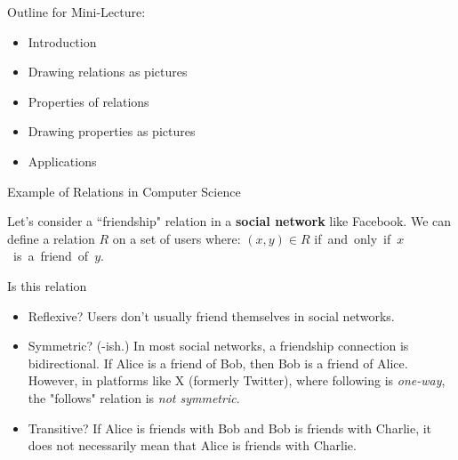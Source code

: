 \documentclass[10pt]{beamer}
\begin{document}
\begin{frame}[standout]
Outline for Mini-Lecture:
\begin{itemize}
\item \textbullet \quad Introduction
\item \textbullet \quad Drawing relations as pictures
\item \textbullet \quad Properties of relations
\item \textbullet \quad Drawing properties as pictures
\item \alert{\textbullet \quad Applications}
\end{itemize}
\end{frame}




\begin{frame}{Example of Relations in Computer Science}
\footnotesize 
\begin{mygreenbox}[title=Example]

Let's consider a ``friendship" relation in a \textbf{social network} like Facebook. We can define a relation $R$ on a set of users where: $(x,y) \in R$ if and only if $x$ is a friend of $y$. 
\end{mygreenbox}

\begin{myyellowbox}[title=Poll]
Is this relation
\begin{itemize}
\item Reflexive? \pause \redx Users don't usually friend themselves in social networks. 
\item Symmetric? \pause \greencheck(-ish.) In most social networks, a friendship connection is bidirectional. If Alice is a friend of Bob, then Bob is a friend of Alice.  However, in platforms like X (formerly Twitter), where following is \textit{one-way}, the "follows" relation is \textit{not symmetric}.
\item Transitive? \pause \redx If  Alice is friends with Bob and Bob is friends with Charlie, it does not necessarily mean that Alice is friends with Charlie.  %
\end{itemize}
\end{myyellowbox}
	
\end{frame}
\end{document}
